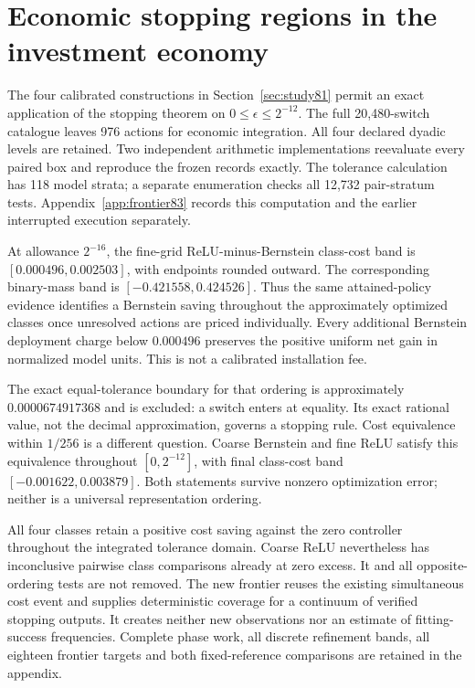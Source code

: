 \section{Economic stopping regions in the investment economy}\label{sec:study83}
The four calibrated constructions in Section~\ref{sec:study81} permit an exact application of the stopping theorem on $0\le\epsilon\le2^{-12}$. The full 20,480-switch catalogue leaves 976 actions for economic integration. All four declared dyadic levels are retained. Two independent arithmetic implementations reevaluate every paired box and reproduce the frozen records exactly. The tolerance calculation has 118 model strata; a separate enumeration checks all 12,732 pair-stratum tests. Appendix~\ref{app:frontier83} records this computation and the earlier interrupted execution separately.

At allowance $2^{-16}$, the fine-grid ReLU-minus-Bernstein class-cost band is $[0.000496,0.002503]$, with endpoints rounded outward. The corresponding binary-mass band is $[-0.421558,0.424526]$. Thus the same attained-policy evidence identifies a Bernstein saving throughout the approximately optimized classes once unresolved actions are priced individually. Every additional Bernstein deployment charge below $0.000496$ preserves the positive uniform net gain in normalized model units. This is not a calibrated installation fee.



The exact equal-tolerance boundary for that ordering is approximately $0.0000674917368$ and is excluded: a switch enters at equality. Its exact rational value, not the decimal approximation, governs a stopping rule. Cost equivalence within $1/256$ is a different question. Coarse Bernstein and fine ReLU satisfy this equivalence throughout $[0,2^{-12}]$, with final class-cost band $[-0.001622,0.003879]$. Both statements survive nonzero optimization error; neither is a universal representation ordering.

All four classes retain a positive cost saving against the zero controller throughout the integrated tolerance domain. Coarse ReLU nevertheless has inconclusive pairwise class comparisons already at zero excess. It and all opposite-ordering tests are not removed. The new frontier reuses the existing simultaneous cost event and supplies deterministic coverage for a continuum of verified stopping outputs. It creates neither new observations nor an estimate of fitting-success frequencies. Complete phase work, all discrete refinement bands, all eighteen frontier targets and both fixed-reference comparisons are retained in the appendix.

